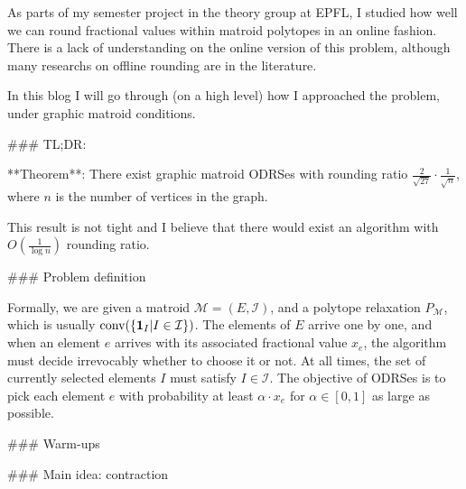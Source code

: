 \newcommand{\tmlX}{\mathcal{X}}
\newcommand{\tmlH}{\mathcal{H}}
\newcommand{\tmlD}{\mathcal{D}}
\newcommand{\vcdim}{\text{VCdim}}
\newcommand{\Prob}{\textnormal{Pr}}
\newcommand{\Expt}{\mathbb{E}}
\newcommand{\squarebrac}[1]{\left[#1\right]}
\newcommand{\curvebrac}[1]{\left(#1\right)}
\newcommand{\pointybrac}[1]{\left\{#1\right\}}

\newcommand{\floor}[1]{\left\lfloor #1 \right\rfloor}
\newcommand{\ceil}[1]{\left\lceil #1 \right\rceil}
\newcommand{\abs}[1]{\left|#1\right|}
\newcommand{\norm}[1]{\left\lVert#1\right\rVert}

\newcommand{\fvx}{\mathbf{x}}
\newcommand{\eps}{\epsilon}
\newcommand{\indict}[1]{\mathbf{1}_{#1}}
\newcommand{\algo}{\mathcal{A}}
\newcommand{\innerprod}[1]{\left\langle#1\right\rangle}
\newcommand{\lL}{\mathscr{L}}

As parts of my semester project in the theory group at EPFL, I studied
how well we can round fractional values within matroid polytopes in an online 
fashion. There is a lack of understanding on the online version of this problem,
although many researchs on offline rounding are in the literature.

In this blog I will go through (on a high level) how I approached the problem,
under graphic matroid conditions.

### TL;DR:

**Theorem**: There exist graphic matroid ODRSes with rounding ratio 
$\frac{2}{\sqrt{27}} \cdot \frac{1}{\sqrt{n}}$, where $n$ is the number of vertices in the graph.

This result is not tight and I believe that there would exist an algorithm with 
$O(\frac{1}{\log n})$ rounding ratio.

### Problem definition

Formally, we are given a matroid $\mathcal{M} = (E, \mathcal{I})$, and a polytope relaxation $P_\mathcal{\mathcal{M}}$, which is usually $\textnormal{conv}(\pointybrac{\indict{I} | I \in \mathcal{I{}}})$.
The elements of $E$ arrive one by one, and when an element $e$ arrives with its associated fractional value $x_e$, the algorithm must decide irrevocably whether to choose it or not.
At all times, the set of currently selected elements $I$ must satisfy $I \in \mathcal{I}$. 
The objective of ODRSes is to pick each element $e$ with probability at least $\alpha \cdot x_e$ for $\alpha \in [0, 1]$ as large as possible.

### Warm-ups

### Main idea: contraction